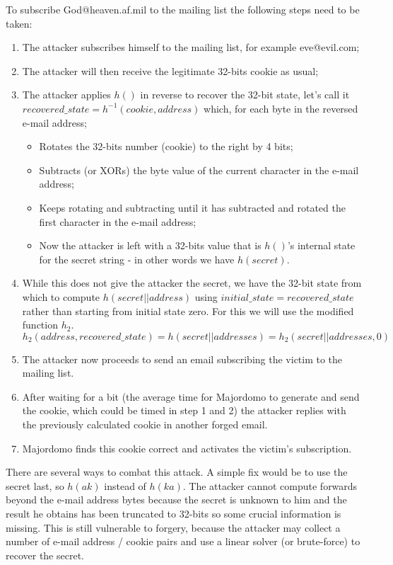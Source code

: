 \documentclass{article}
\begin{document}
To subscribe God@heaven.af.mil to the mailing list the following steps need to be taken:
\begin{enumerate}
	\item The attacker subscribes himself to the mailing list, for example eve@evil.com;
	\item The attacker will then receive the legitimate 32-bits cookie as usual;
	\item The attacker applies $h()$ in reverse to recover the 32-bit state, let's call it $recovered\_state = h^{-1}(cookie, address)$ which, for each byte in the reversed e-mail address;
		\begin{itemize}
		\item Rotates the 32-bits number (cookie) to the right by 4 bits;
		\item Subtracts (or XORs) the byte value of the current character in the e-mail address;
		\item Keeps rotating and subtracting until it has subtracted and rotated the first character in the e-mail address;
		\item Now the attacker is left with a 32-bits value that is $h()$'s internal state for the secret string - in other words we have $h(secret)$.
		\end{itemize}
	\item While this does not give the attacker the secret, we have the 32-bit state from which to compute $h(secret||address)$ using $initial\_state = recovered\_state$ rather than starting from initial state zero.
	For this we will use the modified function $h_2$.
\[ h_2(address, recovered\_state) = h(secret||addresses) = h_2(secret||addresses,0) \]
	\item The attacker now proceeds to send an email subscribing the victim to the mailing list.
	\item After waiting for a bit (the average time for Majordomo to generate and send the cookie, which could be timed in step 1 and 2) the attacker replies with the previously calculated cookie in another forged email.
	\item Majordomo finds this cookie correct and activates the victim's subscription.
\end{enumerate}
	
There are several ways to combat this attack.
A simple fix would be to use the secret last, so $h(ak)$ instead of $h(ka)$.
The attacker cannot compute forwards beyond the e-mail address bytes because the secret is unknown to him and the result he obtains has been truncated to 32-bits so some crucial information is missing.
This is still vulnerable to forgery, because the attacker may collect a number of e-mail address / cookie pairs and use a linear solver (or brute-force) to recover the secret.
\end{document}
